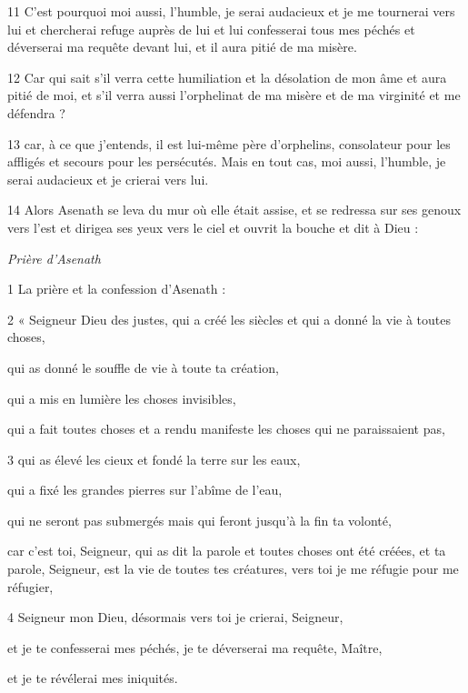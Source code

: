 \par 11 C'est pourquoi moi aussi, l'humble, je serai audacieux et je me tournerai vers lui et chercherai refuge auprès de lui et lui confesserai tous mes péchés et déverserai ma requête devant lui, et il aura pitié de ma misère.

\par 12 Car qui sait s'il verra cette humiliation et la désolation de mon âme et aura pitié de moi, et s'il verra aussi l'orphelinat de ma misère et de ma virginité et me défendra ?

\par 13 car, à ce que j'entends, il est lui-même père d'orphelins, consolateur pour les affligés et secours pour les persécutés. Mais en tout cas, moi aussi, l'humble, je serai audacieux et je crierai vers lui.

\par 14 Alors Asenath se leva du mur où elle était assise, et se redressa sur ses genoux vers l'est et dirigea ses yeux vers le ciel et ouvrit la bouche et dit à Dieu :


\par \textit{Prière d'Asenath}

\par 1 La prière et la confession d'Asenath :

\par 2 « Seigneur Dieu des justes, qui a créé les siècles et qui a donné la vie à toutes choses,
\par qui as donné le souffle de vie à toute ta création,
\par qui a mis en lumière les choses invisibles,
\par qui a fait toutes choses et a rendu manifeste les choses qui ne paraissaient pas,

\par 3 qui as élevé les cieux et fondé la terre sur les eaux,
\par qui a fixé les grandes pierres sur l'abîme de l'eau,
\par qui ne seront pas submergés mais qui feront jusqu'à la fin ta volonté,
\par car c'est toi, Seigneur, qui as dit la parole et toutes choses ont été créées, et ta parole, Seigneur, est la vie de toutes tes créatures, vers toi je me réfugie pour me réfugier,

\par 4 Seigneur mon Dieu, désormais vers toi je crierai, Seigneur,
\par et je te confesserai mes péchés, je te déverserai ma requête, Maître,
\par et je te révélerai mes iniquités.

